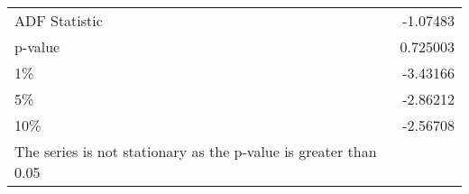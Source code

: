 \begin{tabular}{lr}
\hline
 ADF Statistic                                                    & -1.07483  \\
 p-value                                                          &  0.725003 \\
 1\%                                                               & -3.43166  \\
 5\%                                                               & -2.86212  \\
 10\%                                                              & -2.56708  \\
 The series is not stationary as the p-value is greater than 0.05 &           \\
\hline
\end{tabular}